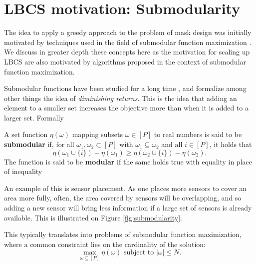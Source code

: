 


\section{LBCS motivation: Submodularity}\label{sec:submodularity}

The idea to apply a greedy approach to the problem of mask design was initially motivated by techniques used in the field of submodular function maximization \citep{baldassarre2016learning,krause2014submodular}. We discuss in greater depth these concepts here as the motivation for scaling up LBCS are also motivated by algorithms proposed in the context of submodular function maximization. 

Submodular functions have been studied for a long time \citep{nemhauser1978analysis, minoux1978accelerated}, and formalize among other things the idea of \textit{diminishing returns}. This is the idea that adding an element to a smaller set increases the objective more than when it is added to a larger set. Formally
\begin{definition}[Submodularity] 
    A set function $\eta(\omega)$ mapping subsets $\omega \in [P] $ to real numbers is said to be \textbf{submodular} if, for all $\omega_1,\omega_2 \subset [P]$ with $\omega_1 \subseteq \omega_2$ and all $i \in [P]$, it holds that
    \begin{equation}
        \eta(\omega_1 \cup \{i\}) - \eta(\omega_1) \geq \eta(\omega_2 \cup \{i\}) - \eta(\omega_2).
    \end{equation}
    The function is said to be \textbf{modular} if the same holds true with equality in place of inequality
\end{definition}
An example of this is sensor placement. As one places more sensors to cover an area more fully, often, the area covered by sensors will be overlapping, and so adding a new sensor will bring less information if a large set of sensors is already available. This is illustrated on Figure \ref{fig:submodularity}. 

This typically translates into problems of submodular function maximization, where a common constraint lies on the cardinality of the solution:
\begin{equation}
    \max_{\omega \subseteq [P]} \eta(\omega) \text{~subject to~}|\omega| \leq N.
\end{equation}

